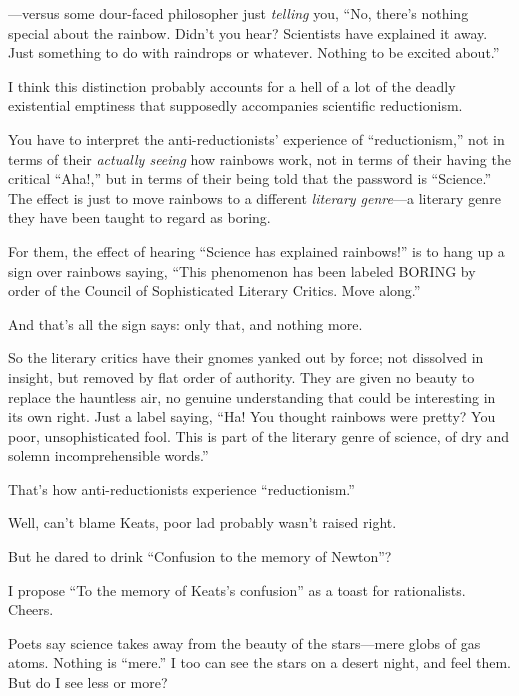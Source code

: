 {
 {}---versus some dour-faced philosopher just \textit{telling} you,
``No, there's nothing special about
the rainbow. Didn't you hear? Scientists have explained
it away. Just something to do with raindrops or whatever. Nothing to be
excited about.''}

{
 I think this distinction probably accounts for a hell of a lot of
the deadly existential emptiness that supposedly accompanies scientific
reductionism.}

{
 You have to interpret the anti-reductionists'
experience of ``reductionism,'' not
in terms of their \textit{actually seeing} how rainbows work, not in
terms of their having the critical
``Aha!,'' but in terms of their
being told that the password is
``Science.'' The effect is just to
move rainbows to a different \textit{literary genre}{}---a literary
genre they have been taught to regard as boring.}

{
 For them, the effect of hearing ``Science has
explained rainbows!'' is to hang up a sign over
rainbows saying, ``This phenomenon has been labeled
BORING by order of the Council of Sophisticated Literary Critics. Move
along.''}

{
 And that's all the sign says: only that, and
nothing more.}

{
 So the literary critics have their gnomes yanked out by force; not
dissolved in insight, but removed by flat order of authority. They are
given no beauty to replace the hauntless air, no genuine understanding
that could be interesting in its own right. Just a label saying,
``Ha! You thought rainbows were pretty? You poor,
unsophisticated fool. This is part of the literary genre of science, of
dry and solemn incomprehensible words.''}

{
 That's how anti-reductionists experience
``reductionism.''}

{
 Well, can't blame Keats, poor lad probably
wasn't raised right.}

{
 But he dared to drink ``Confusion to the memory
of Newton''?}

{
 I propose ``To the memory of
Keats's confusion'' as a toast for
rationalists. Cheers.}

\myendsectiontext


{
 Poets say science takes away from the beauty of the stars---mere
globs of gas atoms. Nothing is
``mere.'' I too can see the stars on
a desert night, and feel them. But do I see less or more?}

